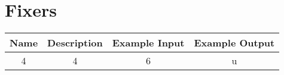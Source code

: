 \section{Fixers}
\label{appendix:Fixers}
\begin{table}
\begin{tabular}[center]{|c|c|c|c|}
    Name & Description & Example Input & Example Output \\
    \hline
    4 & 4 & 6 & u
\end{tabular}
\end{table}